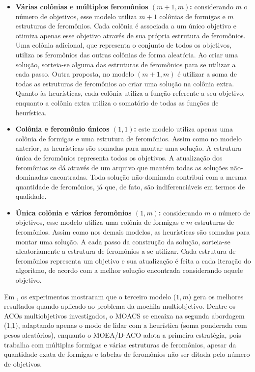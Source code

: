 \begin{itemize}
	\item \textbf{Várias colônias e múltiplos feromônios $(m+1, m)$:} considerando $m$ o número de objetivos, esse modelo utiliza $m + 1$ colônias de formigas e $m$ estruturas de feromônios. Cada colônia é associada a um único objetivo e otimiza apenas esse objetivo através de sua própria estrutura de feromônios. Uma colônia adicional, que representa o conjunto de todos os objetivos, utiliza os feromônios das outras colônias de forma aleatória. Ao criar uma solução, sorteia-se alguma das estruturas de feromônios para se utilizar a cada passo. Outra proposta, no modelo $(m+1, m)$ é utilizar a soma de todas as estruturas de feromônios ao criar uma solução na colônia extra. Quanto às heurísticas, cada colônia utiliza a função referente a seu objetivo, enquanto a colônia extra utiliza o somatório de todas as funções de heurística.
	\item \textbf{Colônia e feromônio únicos $(1,1)$:} este modelo utiliza apenas uma colônia de formigas e uma estrutura de feromônios. Assim como no modelo anterior, as heurísticas são somadas para montar uma solução. A estrutura única de feromônios representa todos os objetivos. A atualização dos feromônios se dá através de um arquivo que mantém todas as soluções não-dominadas encontradas. Toda solução não-dominada contribui com a mesma quantidade de feromônios, já que, de fato, são indiferenciáveis em termos de qualidade.
	\item \textbf{Única colônia e vários feromônios $(1,m)$:} considerando $m$ o número de objetivos, esse modelo utiliza uma colônia de formigas e $m$ estruturas de feromônios. Assim como nos demais modelos, as heurísticas são somadas para montar uma solução. A cada passo da construção da solução, sorteia-se aleatoriamente a estrutura de feromônios a se utilizar. Cada estrutura de feromônios representa um objetivo e sua atualização é feita a cada iteração do algoritmo, de acordo com a melhor solução encontrada considerando aquele objetivo.
\end{itemize}

Em \cite{Alaya2007}, os experimentos mostraram que o terceiro modelo ($1,m$) gera os melhores resultados quando aplicado ao problema da mochila multiobjetivo. Dentre os ACOs multiobjetivos investigados, o MOACS se encaixa na segunda abordagem (1,1), adaptando apenas o modo de lidar com a heurística (soma ponderada com pesos aleatórios), enquanto o MOEA/D-ACO adota a primeira estratégia, pois trabalha com múltiplas formigas e várias estruturas de feromônios, apesar da quantidade exata de formigas e tabelas de feromônios não ser ditada pelo número de objetivos.

